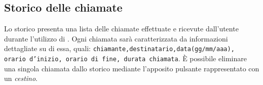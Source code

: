 
\subsection{Storico delle chiamate}
Lo storico presenta una lista delle chiamate effettuate e ricevute dall'utente durante l'utilizzo di \caName{}. Ogni chiamata sarà caratterizzata da informazioni dettagliate su di essa, quali: \texttt{chiamante,destinatario,data(gg/mm/aaa), orario d'inizio, orario di fine, durata chiamata}.
È possibile eliminare una singola chiamata dallo storico mediante l'apposito pulsante rappresentato con un \textit{cestino}.





